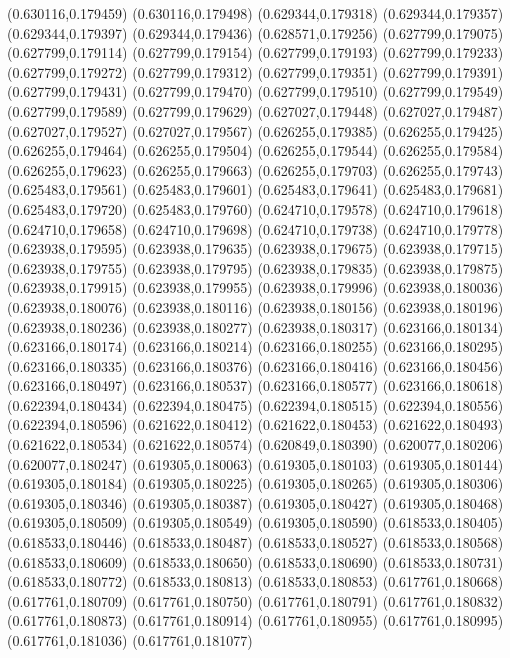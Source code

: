 (0.630116,0.179459)
(0.630116,0.179498)
(0.629344,0.179318)
(0.629344,0.179357)
(0.629344,0.179397)
(0.629344,0.179436)
(0.628571,0.179256)
(0.627799,0.179075)
(0.627799,0.179114)
(0.627799,0.179154)
(0.627799,0.179193)
(0.627799,0.179233)
(0.627799,0.179272)
(0.627799,0.179312)
(0.627799,0.179351)
(0.627799,0.179391)
(0.627799,0.179431)
(0.627799,0.179470)
(0.627799,0.179510)
(0.627799,0.179549)
(0.627799,0.179589)
(0.627799,0.179629)
(0.627027,0.179448)
(0.627027,0.179487)
(0.627027,0.179527)
(0.627027,0.179567)
(0.626255,0.179385)
(0.626255,0.179425)
(0.626255,0.179464)
(0.626255,0.179504)
(0.626255,0.179544)
(0.626255,0.179584)
(0.626255,0.179623)
(0.626255,0.179663)
(0.626255,0.179703)
(0.626255,0.179743)
(0.625483,0.179561)
(0.625483,0.179601)
(0.625483,0.179641)
(0.625483,0.179681)
(0.625483,0.179720)
(0.625483,0.179760)
(0.624710,0.179578)
(0.624710,0.179618)
(0.624710,0.179658)
(0.624710,0.179698)
(0.624710,0.179738)
(0.624710,0.179778)
(0.623938,0.179595)
(0.623938,0.179635)
(0.623938,0.179675)
(0.623938,0.179715)
(0.623938,0.179755)
(0.623938,0.179795)
(0.623938,0.179835)
(0.623938,0.179875)
(0.623938,0.179915)
(0.623938,0.179955)
(0.623938,0.179996)
(0.623938,0.180036)
(0.623938,0.180076)
(0.623938,0.180116)
(0.623938,0.180156)
(0.623938,0.180196)
(0.623938,0.180236)
(0.623938,0.180277)
(0.623938,0.180317)
(0.623166,0.180134)
(0.623166,0.180174)
(0.623166,0.180214)
(0.623166,0.180255)
(0.623166,0.180295)
(0.623166,0.180335)
(0.623166,0.180376)
(0.623166,0.180416)
(0.623166,0.180456)
(0.623166,0.180497)
(0.623166,0.180537)
(0.623166,0.180577)
(0.623166,0.180618)
(0.622394,0.180434)
(0.622394,0.180475)
(0.622394,0.180515)
(0.622394,0.180556)
(0.622394,0.180596)
(0.621622,0.180412)
(0.621622,0.180453)
(0.621622,0.180493)
(0.621622,0.180534)
(0.621622,0.180574)
(0.620849,0.180390)
(0.620077,0.180206)
(0.620077,0.180247)
(0.619305,0.180063)
(0.619305,0.180103)
(0.619305,0.180144)
(0.619305,0.180184)
(0.619305,0.180225)
(0.619305,0.180265)
(0.619305,0.180306)
(0.619305,0.180346)
(0.619305,0.180387)
(0.619305,0.180427)
(0.619305,0.180468)
(0.619305,0.180509)
(0.619305,0.180549)
(0.619305,0.180590)
(0.618533,0.180405)
(0.618533,0.180446)
(0.618533,0.180487)
(0.618533,0.180527)
(0.618533,0.180568)
(0.618533,0.180609)
(0.618533,0.180650)
(0.618533,0.180690)
(0.618533,0.180731)
(0.618533,0.180772)
(0.618533,0.180813)
(0.618533,0.180853)
(0.617761,0.180668)
(0.617761,0.180709)
(0.617761,0.180750)
(0.617761,0.180791)
(0.617761,0.180832)
(0.617761,0.180873)
(0.617761,0.180914)
(0.617761,0.180955)
(0.617761,0.180995)
(0.617761,0.181036)
(0.617761,0.181077)
